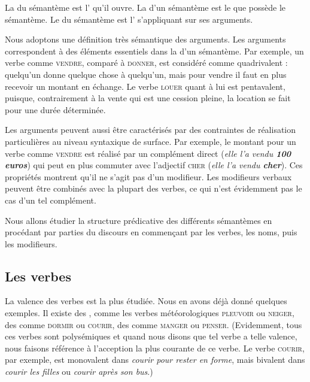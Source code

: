 {La  du sémantème est l’ qu’il ouvre. La  d’un sémantème est le  que possède le sémantème. Le  du sémantème est l’ s’appliquant sur ses arguments.}

Nous adoptons une définition très sémantique des arguments. Les arguments correspondent à des éléments essentiels dans la  d’un sémantème. Par exemple, un verbe comme \textsc{vendre}, comparé à \textsc{donner}, est considéré comme quadrivalent : quelqu’un donne quelque chose à quelqu’un, mais pour vendre il faut en plus recevoir un montant en échange. Le verbe \textsc{louer} quant à lui est pentavalent, puisque, contrairement à la vente qui est une cession pleine, la location se fait pour une durée déterminée.

Les arguments peuvent aussi être caractérisés par des contraintes de réalisation particulières au niveau syntaxique de surface. Par exemple, le montant pour un verbe comme \textsc{vendre} est réalisé par un complément direct (\textit{elle l’a vendu \textbf{100 euros}}) qui peut en plus commuter avec l’adjectif \textsc{cher} (\textit{elle l’a vendu \textbf{cher}}). Ces propriétés montrent qu’il ne s’agit pas d’un modifieur. Les modifieurs verbaux peuvent être combinés avec la plupart des verbes, ce qui n’est évidemment pas le cas d’un tel complément.

Nous allons étudier la structure prédicative des différents sémantèmes en procédant par parties du discours en commençant par les verbes, les noms, puis les modifieurs.

\subsection{Les verbes}
La valence des verbes est la plus étudiée. Nous en avons déjà donné quelques exemples. Il existe des , comme les verbes météorologiques \textsc{pleuvoir} ou \textsc{neiger}, des  comme \textsc{dormir} ou \textsc{courir}, des  comme \textsc{manger} ou \textsc{penser}. (Evidemment, tous ces verbes sont polysémiques et quand nous disons que tel verbe a telle valence, nous faisons référence à l’acception la plus courante de ce verbe. Le verbe \textsc{courir}, par exemple, est monovalent dans \textit{courir pour rester en forme}, mais bivalent dans \textit{courir les filles} ou \textit{courir après son bus}.) 

